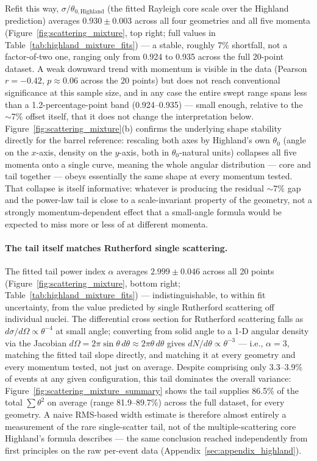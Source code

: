 \documentclass[a4paper,11pt]{article}
\begin{document}
Refit this way, $\sigma / \theta_{0,\text{Highland}}$ (the fitted Rayleigh core scale over the Highland prediction) averages $0.930 \pm 0.003$ across all four geometries and all five momenta (Figure~\ref{fig:scattering_mixture}, top right; full values in Table~\ref{tab:highland_mixture_fits}) --- a stable, roughly 7\% shortfall, not a factor-of-two one, ranging only from 0.924 to 0.935 across the full 20-point dataset. A weak downward trend with momentum is visible in the data (Pearson $r = -0.42$, $p \approx 0.06$ across the 20 points) but does not reach conventional significance at this sample size, and in any case the entire swept range spans less than a 1.2-percentage-point band (0.924--0.935) --- small enough, relative to the $\sim$7\% offset itself, that it does not change the interpretation below. Figure~\ref{fig:scattering_mixture}(b) confirms the underlying shape stability directly for the barrel reference: rescaling both axes by Highland's own $\theta_0$ (angle on the $x$-axis, density on the $y$-axis, both in $\theta_0$-natural units) collapses all five momenta onto a single curve, meaning the whole angular distribution --- core and tail together --- obeys essentially the same shape at every momentum tested. That collapse is itself informative: whatever is producing the residual $\sim$7\% gap and the power-law tail is close to a scale-invariant property of the geometry, not a strongly momentum-dependent effect that a small-angle formula would be expected to miss more or less of at different momenta.

\paragraph{The tail itself matches Rutherford single scattering.} The fitted tail power index $\alpha$ averages $2.999 \pm 0.046$ across all 20 points (Figure~\ref{fig:scattering_mixture}, bottom right; Table~\ref{tab:highland_mixture_fits}) --- indistinguishable, to within fit uncertainty, from the value predicted by single Rutherford scattering off individual nuclei. The differential cross section for Rutherford scattering falls as $d\sigma/d\Omega \propto \theta^{-4}$ at small angle; converting from solid angle to a 1-D angular density via the Jacobian $d\Omega = 2\pi \sin\theta\, d\theta \approx 2\pi\theta\, d\theta$ gives $dN/d\theta \propto \theta^{-3}$ --- i.e., $\alpha = 3$, matching the fitted tail slope directly, and matching it at every geometry and every momentum tested, not just on average. Despite comprising only 3.3--3.9\% of events at any given configuration, this tail dominates the overall variance: Figure~\ref{fig:scattering_mixture_summary} shows the tail supplies 86.5\% of the total $\sum\theta^2$ on average (range 81.9--89.7\%) across the full dataset, for every geometry. A naive RMS-based width estimate is therefore almost entirely a measurement of the rare single-scatter tail, not of the multiple-scattering core Highland's formula describes --- the same conclusion reached independently from first principles on the raw per-event data (Appendix~\ref{sec:appendix_highland}).
\end{document}
